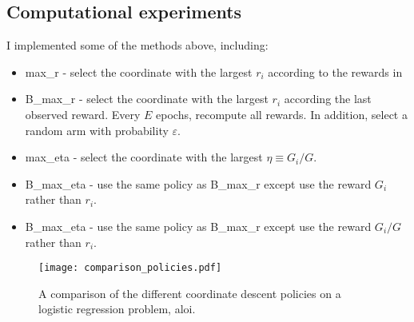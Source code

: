 \documentclass[letterpaper]{article}
\newcommand{\istar}{i^*}
\begin{document}
\subsection{Computational experiments}

I implemented some of the methods above, including:
\begin{itemize}
\item max\_r - select the coordinate with the largest $r_i$ according to the rewards in~\cite{salehi2018coordinate}
\item B\_max\_r - select the coordinate with the largest $r_i$ according the last observed reward. Every $E$ epochs, recompute all rewards. In addition, select a random arm with probability $\varepsilon$.
\item max\_eta - select the coordinate with the largest $\eta\equiv G_i/G$.
\item B\_max\_eta - use the same policy as B\_max\_r except use the reward $G_i$ rather than $r_i$.
\item B\_max\_eta - use the same policy as B\_max\_r except use the reward $G_i/G$ rather than $r_i$.
\end{itemize}

\begin{figure}[htp]
    \centering
    \texttt{[image: comparison\_policies.pdf]}
    \caption{A comparison of the different coordinate descent policies on a logistic regression problem, aloi.}
\end{figure}






\end{document}
